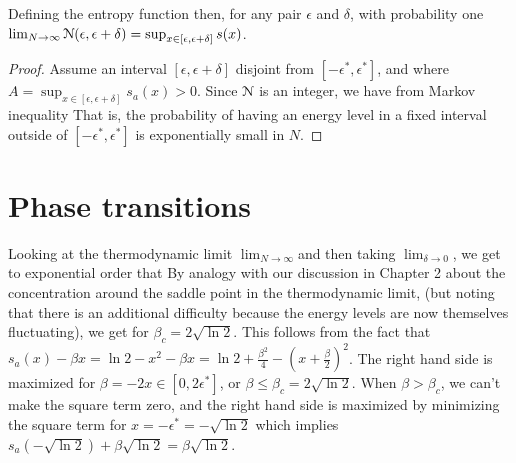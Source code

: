 \documentclass[letterpaper,english,10pt]{article}
\begin{document}
\begin{prop}
Defining the entropy function 
then, for any pair $\epsilon$ and $\delta$, with probability one 
$\lim_{N\to\infty}\mathcal{N}(\epsilon, \epsilon+\delta) = \sup_{x \in [\epsilon, \epsilon+\delta]}s(x)$.
\end{prop}
\begin{proof}
Assume an interval $[\epsilon, \epsilon+\delta]$ disjoint from $[-\epsilon^\ast, \epsilon^\ast]$, 
and 
where $A = \sup_{x \in [\epsilon, \epsilon+\delta]}s_a(x) > 0$. 
Since $\mathcal{N}$ is an integer, we have from Markov inequality 
That is, the probability of having an energy level in a fixed interval outside of $[-\epsilon^\ast, \epsilon^\ast]$ is exponentially small in $N$.
\end{proof}

\section{Phase transitions}
Looking at the thermodynamic limit $\lim_{N \to \infty}$and then taking $\lim_{\delta \to 0}$, 
we get to exponential order that
By analogy with our discussion in Chapter 2 about the concentration around the saddle
point in the thermodynamic limit, (but noting that there is an additional difficulty because the energy levels are now themselves fluctuating), we get
for $\beta_c = 2\sqrt{\ln2}$. 
This follows from the fact that $s_a(x)-\beta x = \ln2-x^2-\beta x = \ln 2 +\frac{\beta^2}{4}-\left(x+\frac{\beta}{2}\right)^2$. 
The right hand side is maximized for $\beta = -2x \in [0, 2\epsilon^\ast]$, or $\beta \le \beta_c = 2\sqrt{\ln2}$. 
When $\beta > \beta_c$, we can't make the square term zero, and the right hand side is maximized by minimizing the square term for $x = -\epsilon^\ast = -\sqrt{\ln2}$ which implies $s_a(-\sqrt{\ln2})+\beta\sqrt{\ln2} = \beta\sqrt{\ln2}$. 
\end{document}
